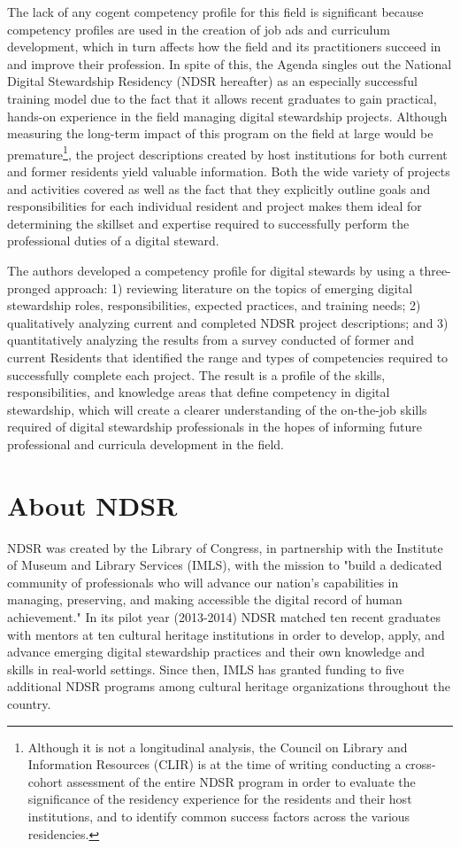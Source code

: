 \documentclass{acm_proc_article-sp}
\begin{document}
The lack of any cogent competency profile for this field is significant because competency profiles are used in the creation of job ads and curriculum development, which in turn affects how the field and its practitioners succeed in and improve their profession. In spite of this, the Agenda singles out the National Digital Stewardship Residency (NDSR hereafter) as an especially successful training model due to the fact that it allows recent graduates to gain practical, hands-on experience in the field managing digital stewardship projects. Although measuring the long-term impact of this program on the field at large would be premature\footnote{Although it is not a longitudinal analysis, the Council on Library and Information Resources (CLIR) is at the time of writing conducting a cross-cohort assessment of the entire NDSR program in order to evaluate the significance of the residency experience for the residents and their host institutions, and to identify common success factors across the various residencies.\cite{2}}, the project descriptions created by host institutions for both current and former residents yield valuable information. Both the wide variety of projects and activities covered as well as the fact that they explicitly outline goals and responsibilities for each individual resident and project makes them ideal for determining the skillset and expertise required to successfully perform the professional duties of a digital steward. 

The authors developed a competency profile for digital stewards by using a three-pronged approach: 1) reviewing literature on the topics of emerging digital stewardship roles, responsibilities, expected practices, and training needs; 2) qualitatively analyzing current and completed NDSR project descriptions; and 3) quantitatively analyzing the results from a survey conducted of former and current Residents that identified the range and types of competencies required to successfully complete each project. The result is a profile of the skills, responsibilities, and knowledge areas that define competency in digital stewardship, which will create a clearer understanding of the on-the-job skills required of digital stewardship professionals in the hopes of informing future professional and curricula development in the field.

\section{About NDSR}
NDSR was created by the Library of Congress, in partnership with the Institute of Museum and Library Services (IMLS), with the mission to "build a dedicated community of professionals who will advance our nation's capabilities in managing, preserving, and making accessible the digital record of human achievement."\cite{3} In its pilot year (2013-2014) NDSR matched ten recent graduates with mentors at ten cultural heritage institutions in order to develop, apply, and advance emerging digital stewardship practices and their own knowledge and skills in real-world settings. Since then, IMLS has granted funding to five additional NDSR programs among cultural heritage organizations throughout the country.
\end{document}
